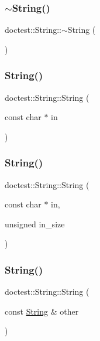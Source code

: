 \subsubsection{\texorpdfstring{$\sim$\+String()}{~String()}}
{\footnotesize\ttfamily doctest\+::\+String\+::$\sim$\+String (\begin{DoxyParamCaption}{ }\end{DoxyParamCaption})}

\mbox{\label{classdoctest_1_1_string_abb4449cbc613cd973ae774c704fca5dd}} 
\subsubsection{\texorpdfstring{String()}{String()}\hspace{0.1cm}{\footnotesize\ttfamily [2/5]}}
{\footnotesize\ttfamily doctest\+::\+String\+::\+String (\begin{DoxyParamCaption}\item[{const char $\ast$}]{in }\end{DoxyParamCaption})}

\mbox{\label{classdoctest_1_1_string_a01d9f84ab0a3dc67b195678b6073dd4c}} 
\subsubsection{\texorpdfstring{String()}{String()}\hspace{0.1cm}{\footnotesize\ttfamily [3/5]}}
{\footnotesize\ttfamily doctest\+::\+String\+::\+String (\begin{DoxyParamCaption}\item[{const char $\ast$}]{in,  }\item[{unsigned}]{in\+\_\+size }\end{DoxyParamCaption})}

\mbox{\label{classdoctest_1_1_string_a27ca7976da20bdebbf225fa496c38ad1}} 
\subsubsection{\texorpdfstring{String()}{String()}\hspace{0.1cm}{\footnotesize\ttfamily [4/5]}}
{\footnotesize\ttfamily doctest\+::\+String\+::\+String (\begin{DoxyParamCaption}\item[{const \hyperlink{classdoctest_1_1_string}{String} \&}]{other }\end{DoxyParamCaption})}

